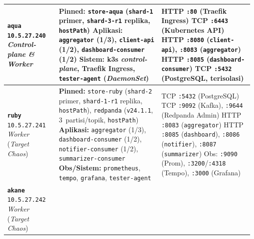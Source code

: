 {\begin{spacing}{1.05}
\begin{xltabular}{\textwidth}{>{\raggedright\arraybackslash}p{2.8cm} >{\raggedright\arraybackslash}X >{\raggedright\arraybackslash}p{5.6cm}}
\textbf{\texttt{aqua}} \newline \texttt{10.5.27.240} \newline \textit{Control-plane \& Worker} &
\textbf{Pinned:} \texttt{store-aqua} (\texttt{shard-1} primer, \texttt{shard-3-r1} replika, \texttt{hostPath}) \newline
\textbf{Aplikasi:} \texttt{aggregator} (1/3), \texttt{client-api} (1/2), \texttt{dashboard-consumer} (1/2) \newline
\textbf{Sistem:} k3s \textit{control-plane}, Traefik Ingress, \texttt{tester-agent} (\textit{DaemonSet}) &
HTTP \texttt{:80} (Traefik Ingress) \newline
TCP \texttt{:6443} (Kubernetes API) \newline
HTTP \texttt{:8080} (\texttt{client-api}), \texttt{:8083} (\texttt{aggregator}) \newline
HTTP \texttt{:8085} (\texttt{dashboard-consumer}) \newline
TCP \texttt{:5432} (PostgreSQL, terisolasi) \\
\midrule
\textbf{\texttt{ruby}} \newline \texttt{10.5.27.241} \newline \textit{Worker} \newline (\textit{Target Chaos}) &
\textbf{Pinned:} \texttt{store-ruby} (\texttt{shard-2} primer, \texttt{shard-1-r1} replika, \texttt{hostPath}), \texttt{redpanda} (\texttt{v24.1.1}, 3~partisi/topik, \texttt{hostPath}) \newline
\textbf{Aplikasi:} \texttt{aggregator} (1/3), \texttt{dashboard-consumer} (1/2), \texttt{notifier-consumer} (1/2), \texttt{summarizer-consumer} \newline
\textbf{Obs/Sistem:} \texttt{prometheus}, \texttt{tempo}, \texttt{grafana}, \texttt{tester-agent} &
TCP \texttt{:5432} (PostgreSQL) \newline
TCP \texttt{:9092} (Kafka), \texttt{:9644} (Redpanda Admin) \newline
HTTP \texttt{:8083} (\texttt{aggregator}) \newline
HTTP \texttt{:8085} (\texttt{dashboard}), \texttt{:8086} (\texttt{notifier}), \texttt{:8087} (\texttt{summarizer}) \newline
Obs: \texttt{:9090} (Prom), \texttt{:3200}/\texttt{:4318} (Tempo), \texttt{:3000} (Grafana) \\
\midrule
\textbf{\texttt{akane}} \newline \texttt{10.5.27.242} \newline \textit{Worker} \newline (\textit{Target Chaos}) &

\end{xltabular}
\end{spacing}}
